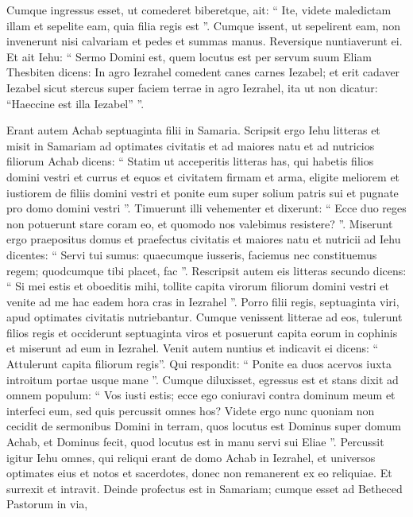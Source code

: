 \begin{biblechapter}
\begin{biblechapter}
\begin{biblechapter}
\begin{biblechapter}
\begin{biblechapter}
\begin{biblechapter}
\begin{biblechapter}
\begin{biblechapter}
\begin{biblechapter}
\verse Cumque ingressus esset, ut comederet biberetque, ait: “ Ite, videte maledictam illam et sepelite eam, quia filia regis est ”. 
\verse Cumque issent, ut sepelirent eam, non invenerunt nisi calvariam et pedes et summas manus. 
\verse Reversique nuntiaverunt ei. Et ait Iehu: “ Sermo Domini est, quem locutus est per servum suum Eliam Thesbiten dicens: In agro Iezrahel comedent canes carnes Iezabel; 
\verse et erit cadaver Iezabel sicut stercus super faciem terrae in agro Iezrahel, ita ut non dicatur: “Haeccine est illa Iezabel” ”.
 
\begin{biblechapter}
 \verse Erant autem Achab septuaginta filii in Samaria. Scripsit ergo Iehu litteras et misit in Samariam ad optimates civitatis et ad maiores natu et ad nutricios filiorum Achab dicens: 
\verse “ Statim ut acceperitis litteras has, qui habetis filios domini vestri et currus et equos et civitatem firmam et arma, 
\verse eligite meliorem et iustiorem de filiis domini vestri et ponite eum super solium patris sui et pugnate pro domo domini vestri ”. 
\verse Timuerunt illi vehementer et dixerunt: “ Ecce duo reges non potuerunt stare coram eo, et quomodo nos valebimus resistere? ”. 
\verse Miserunt ergo praepositus domus et praefectus civitatis et maiores natu et nutricii ad Iehu dicentes: “ Servi tui sumus: quaecumque iusseris, faciemus nec constituemus regem; quodcumque tibi placet, fac ”.
 \verse Rescripsit autem eis litteras secundo dicens: “ Si mei estis et oboeditis mihi, tollite capita virorum filiorum domini vestri et venite ad me hac eadem hora cras in Iezrahel ”. Porro filii regis, septuaginta viri, apud optimates civitatis nutriebantur. 
\verse Cumque venissent litterae ad eos, tulerunt filios regis et occiderunt septuaginta viros et posuerunt capita eorum in cophinis et miserunt ad eum in Iezrahel.
 \verse Venit autem nuntius et indicavit ei dicens: “ Attulerunt capita filiorum regis”. Qui respondit: “ Ponite ea duos acervos iuxta introitum portae usque mane ”. 
\verse Cumque diluxisset, egressus est et stans dixit ad omnem populum: “ Vos iusti estis; ecce ego coniuravi contra dominum meum et interfeci eum, sed quis percussit omnes hos? 
\verse Videte ergo nunc quoniam non cecidit de sermonibus Domini in terram, quos locutus est Dominus super domum Achab, et Dominus fecit, quod locutus est in manu servi sui Eliae ”. 
\verse Percussit igitur Iehu omnes, qui reliqui erant de domo Achab in Iezrahel, et universos optimates eius et notos et sacerdotes, donec non remanerent ex eo reliquiae.
 \verse Et surrexit et intravit. Deinde profectus est in Samariam; cumque esset ad Betheced Pastorum in via, 

\end{biblechapter}
\end{biblechapter}
\end{biblechapter}
\end{biblechapter}
\end{biblechapter}
\end{biblechapter}
\end{biblechapter}
\end{biblechapter}
\end{biblechapter}
\end{biblechapter}

